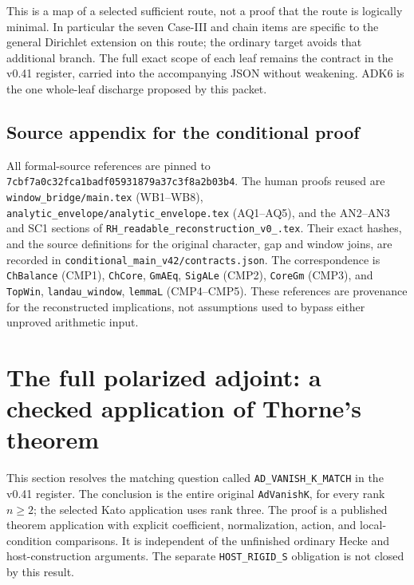 \documentclass[11pt,a4paper]{article}
\numberwithin{equation}{section}
\theoremstyle{remark}\newtheorem{remark}[theorem]{Remark}
\begin{document}
This is a map of a selected sufficient route, not a proof that the
route is logically minimal.  In particular the seven Case-III and
chain items are specific to the general Dirichlet extension on this
route; the ordinary target avoids that additional branch.  The
full exact scope of each leaf remains the contract in the v0.41
register, carried into the accompanying JSON without weakening.
ADK6 is the one whole-leaf discharge proposed by this packet.

\subsection{Source appendix for the conditional proof}

All formal-source references are pinned to
\texttt{7cbf7a0c32fca1badf05931879a37c3f8a2b03b4}.
The human proofs reused are
\texttt{window\_\allowbreak bridge/\allowbreak main.\allowbreak tex} (WB1--WB8),
\texttt{analytic\_\allowbreak envelope/\allowbreak analytic\_\allowbreak envelope.\allowbreak tex} (AQ1--AQ5),
and the AN2--AN3 and SC1 sections of
\texttt{RH\_\allowbreak readable\_\allowbreak reconstruction\_\allowbreak v0\_.\allowbreak tex}.
Their exact hashes, and the source definitions for the original
character, gap and window joins, are recorded in
\texttt{conditional\_\allowbreak main\_\allowbreak v42/\allowbreak contracts.\allowbreak json}.
The correspondence is
\texttt{Ch\allowbreak Balance} (CMP1),
\texttt{Ch\allowbreak Core}, \texttt{Gm\allowbreak AEq}, \texttt{Sig\allowbreak ALe} (CMP2),
\texttt{Core\allowbreak Gm} (CMP3), and
\texttt{Top\allowbreak Win}, \texttt{landau\_\allowbreak window}, \texttt{lemma\allowbreak L}
(CMP4--CMP5).  These references are provenance for the
reconstructed implications, not assumptions used to bypass either
unproved arithmetic input.


\section{The full polarized adjoint: a checked application of Thorne's theorem}
\label{sec:adk-match}

This section resolves the matching question called
\texttt{AD\_\allowbreak VANISH\_\allowbreak K\_\allowbreak MATCH} in the v0.41 register.  The conclusion is
the entire original \texttt{Ad\allowbreak Vanish\allowbreak K}, for every rank $n\ge2$; the
selected Kato application uses rank three.  The proof is a published
theorem application with explicit coefficient, normalization, action,
and local-condition comparisons.  It is independent of the unfinished
ordinary Hecke and host-construction arguments.  The separate
\texttt{HOST\_\allowbreak RIGID\_\allowbreak S} obligation is not closed by this result.
\end{document}
